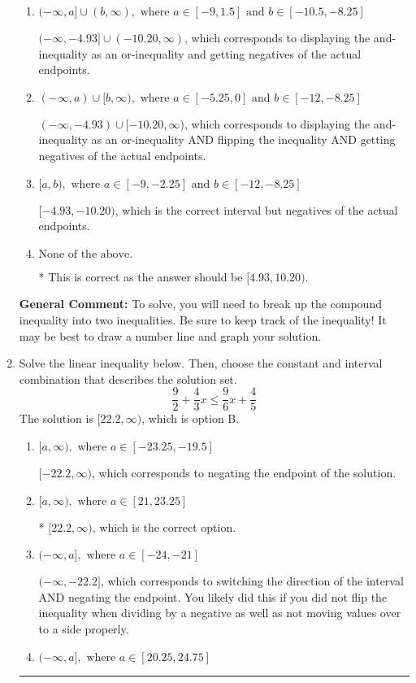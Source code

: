 \documentclass{extbook}[14pt]
\newcommand{\litem}[1]{\item #1

\rule{\textwidth}{0.4pt}}
\begin{document}
\begin{enumerate}
{\begin{enumerate}[label=\Alph*.]
$(-4.93, -10.20]$, which corresponds to flipping the inequality and getting negatives of the actual endpoints.
\item \( (-\infty, a] \cup (b, \infty), \text{ where } a \in [-9, 1.5] \text{ and } b \in [-10.5, -8.25] \)

$(-\infty, -4.93] \cup (-10.20, \infty)$, which corresponds to displaying the and-inequality as an or-inequality and getting negatives of the actual endpoints.
\item \( (-\infty, a) \cup [b, \infty), \text{ where } a \in [-5.25, 0] \text{ and } b \in [-12, -8.25] \)

$(-\infty, -4.93) \cup [-10.20, \infty)$, which corresponds to displaying the and-inequality as an or-inequality AND flipping the inequality AND getting negatives of the actual endpoints.
\item \( [a, b), \text{ where } a \in [-9, -2.25] \text{ and } b \in [-12, -8.25] \)

$[-4.93, -10.20)$, which is the correct interval but negatives of the actual endpoints.
\item \( \text{None of the above.} \)

* This is correct as the answer should be $[4.93, 10.20)$.
\end{enumerate}

\textbf{General Comment:} To solve, you will need to break up the compound inequality into two inequalities. Be sure to keep track of the inequality! It may be best to draw a number line and graph your solution.
}
\litem{
Solve the linear inequality below. Then, choose the constant and interval combination that describes the solution set.
\[ \frac{9}{2} + \frac{4}{3} x \leq \frac{9}{6} x + \frac{4}{5} \]The solution is \( [22.2, \infty) \), which is option B.\begin{enumerate}[label=\Alph*.]
\item \( [a, \infty), \text{ where } a \in [-23.25, -19.5] \)

 $[-22.2, \infty)$, which corresponds to negating the endpoint of the solution.
\item \( [a, \infty), \text{ where } a \in [21, 23.25] \)

* $[22.2, \infty)$, which is the correct option.
\item \( (-\infty, a], \text{ where } a \in [-24, -21] \)

 $(-\infty, -22.2]$, which corresponds to switching the direction of the interval AND negating the endpoint. You likely did this if you did not flip the inequality when dividing by a negative as well as not moving values over to a side properly.
\item \( (-\infty, a], \text{ where } a \in [20.25, 24.75] \)


\end{enumerate}}
\end{enumerate}
\end{document}
